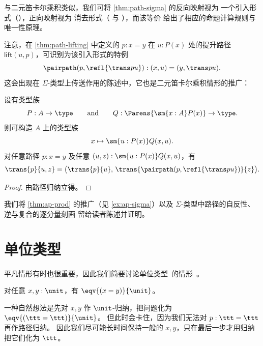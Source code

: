 与二元笛卡尔乘积类似，我们可将
\cref{thm:path-sigma} 的反向映射视为
一个引入形式（\pairpath{}{}），正向映射视为
消去形式（ 与 ），而该等价
给出了相应的命题计算规则与唯一性原理。

注意，在 \cref{thm:path-lifting} 中定义的 $p:x=y$ 在 $u:P(x)$ 处的提升路径 $\mathsf{lift}(u,p)$，可识别为该引入形式的特例
\[\pairpath(p,\refl{\trans p u}):(x,u) = (y,\trans p u).\]
%
这会出现在 $\Sigma$-类型上传送作用的陈述中，它也是二元笛卡尔乘积情形的推广：

\begin{thm}\label{transport-Sigma}
  设有类型族
  \begin{equation*}
    P:A\to\type
    \qquad\text{and}\qquad
    Q:\Parens{\sm{x:A} P(x)}\to\type.
  \end{equation*}
  则可构造 $A$ 上的类型族
  \begin{equation*}
    x \mapsto \sm{u:P(x)} Q(x,u).
  \end{equation*}
  对任意路径 $p:x=y$ 及任意 $(u,z):\sm{u:P(x)} Q(x,u)$，有
  \begin{equation*}
    \trans{p}{u,z}=\big(\trans{p}{u},\,\trans{\pairpath(p,\refl{\trans pu})}{z}\big).
  \end{equation*}
\end{thm}

\begin{proof}
由路径归纳立得。
\end{proof}

我们将 \cref{thm:ap-prod} 的推广（见 \cref{ex:ap-sigma}）以及
$\Sigma$-类型中路径的自反性、逆与复合的逐分量刻画
留给读者陈述并证明。

%

\section{单位类型}
\label{sec:compute-unit}

%
平凡情形有时也很重要，因此我们简要讨论单位类型~\unit 的情形。

\begin{thm}\label{thm:path-unit}
  对任意 $x,y:\unit$，有 $\eqv{(x=y)}{\unit}$。
\end{thm}

一种自然想法是先对 $x,y$ 作 $\unit$-归纳，把问题化为 $\eqv{(\ttt=\ttt)}{\unit}$。
但此时会卡住，因为我们无法对 $p:\ttt=\ttt$ 再作路径归纳。
因此我们尽可能长时间保持一般的 $x,y$，只在最后一步才用归纳把它们化为 $\ttt$。


